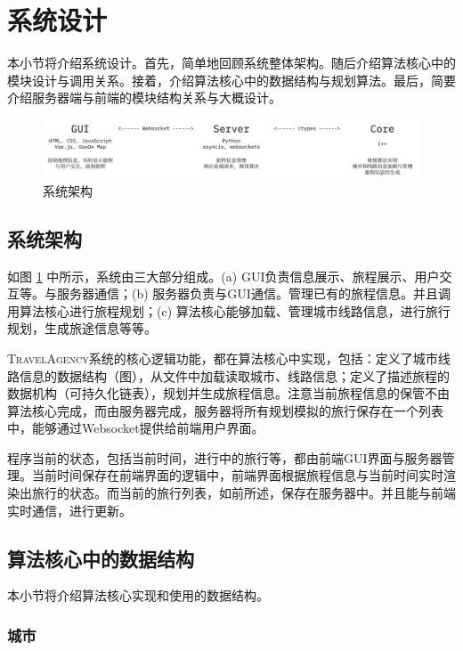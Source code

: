 \section{系统设计}
\label{sec:design}

本小节将介绍系统设计。首先，简单地回顾系统整体架构。随后介绍算法核心中的模块设计与调用关系。接着，介绍算法核心中的数据结构与规划算法。最后，简要介绍服务器端与前端的模块结构关系与大概设计。

\begin{figure}[t]
  \centering
  \includegraphics[width=\textwidth]{figures/system_arch}
  \caption{系统架构}
  \label{fig:system-arch}
\end{figure}

\subsection{系统架构}

如图 \ref{fig:system-arch} 中所示，系统由三大部分组成。(a) GUI负责信息展示、旅程展示、用户交互等。与服务器通信；(b) 服务器负责与GUI通信。管理已有的旅程信息。并且调用算法核心进行旅程规划；(c) 算法核心能够加载、管理城市线路信息，进行旅行规划，生成旅途信息等等。

\textsc{TravelAgency}系统的核心逻辑功能，都在算法核心中实现，包括：定义了城市线路信息的数据结构（图），从文件中加载读取城市、线路信息；定义了描述旅程的数据机构（可持久化链表），规划并生成旅程信息。注意当前旅程信息的保管不由算法核心完成，而由服务器完成，服务器将所有规划模拟的旅行保存在一个列表中，能够通过Websocket提供给前端用户界面。

程序当前的状态，包括当前时间，进行中的旅行等，都由前端GUI界面与服务器管理。当前时间保存在前端界面的逻辑中，前端界面根据旅程信息与当前时间实时渲染出旅行的状态。而当前的旅行列表，如前所述，保存在服务器中。并且能与前端实时通信，进行更新。

\subsection{算法核心中的数据结构}

本小节将介绍算法核心实现和使用的数据结构。

\subsubsection{城市}

